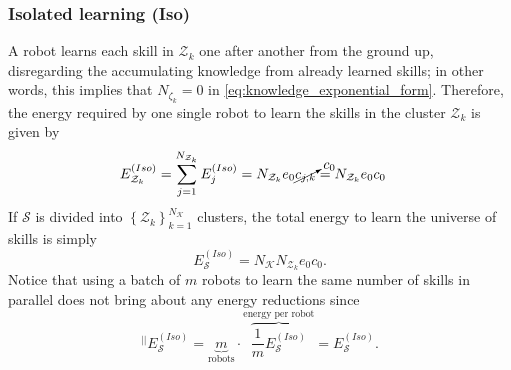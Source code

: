 \subsubsection{\textbf{Isolated learning (Iso)}} A robot learns each skill in $\mathcal{Z}_k$ one after another from the ground up, disregarding the accumulating knowledge from already learned skills; in other words, this implies that $N_{\mathcal{\zeta}_k} = 0$ in \eqref{eq:knowledge_exponential_form}. Therefore, the energy required by one single robot to learn the skills in the cluster $\mathcal{Z}_k$ is given by
 \begin{align}
     \begin{split}
       E^{(Iso)}_{\mathcal{Z}_k} &= \sum_{j=1}^{N_{\mathcal{Z}_k}} E^{(Iso)}_j= N_{\mathcal{Z}_k}  e_{0} \cancelto{c_{0}}{c_{j,k}} = N_{\mathcal{Z}_k} e_{0}  c_0
     \end{split}
 \end{align}
If $\mathcal{S}$ is divided into $\left\lbrace \mathcal{Z}_k \right\rbrace^{N_\mathcal{K}}_{k=1} $ clusters, the total energy to learn the universe of skills is simply
\begin{equation}
	E^{(Iso)}_{\mathcal{S}} = N_\mathcal{K} N_{\mathcal{Z}_k} e_{0}  c_0.
\end{equation}
Notice that using a batch of $m$ robots to learn the same number of skills in parallel does not bring about any energy reductions since
\begin{equation}
    ^{\lvert \lvert}E^{(Iso)}_\mathcal{S}= \underbrace{m}_{\text{robots}}\cdot \overbrace{\frac{1}{m}E^{(Iso)}_\mathcal{S}}^{\text{energy per robot}} = E^{(Iso)}_\mathcal{S}.
\end{equation}



